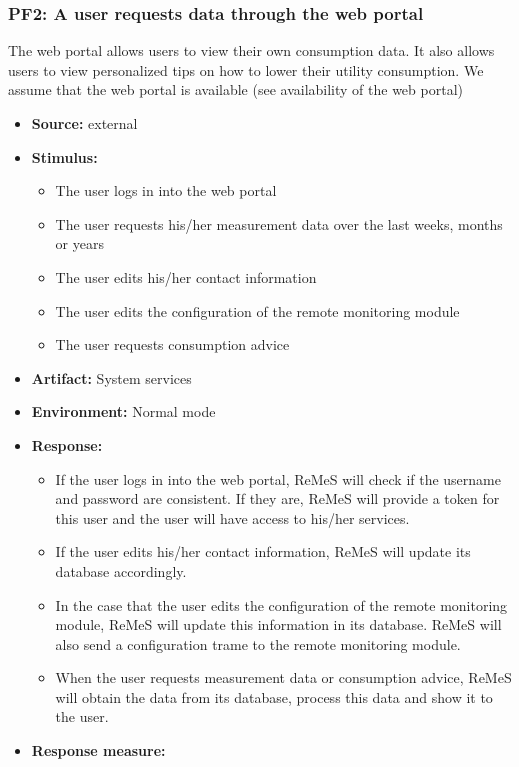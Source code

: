 \subsubsection{PF2: A user requests data through the web portal}
The web portal allows users to view their own consumption data. It also allows users to view
personalized tips on how to lower their utility consumption. We assume that the web portal is available (see availability of the web portal)
\begin{itemize}
	\item \textbf{Source:} external
	\item \textbf{Stimulus:} 
		\begin{itemize}
			\item The user logs in into the web portal
			\item The user requests his/her measurement data over the last weeks, months or years
			\item The user edits his/her contact information
			\item The user edits the configuration of the remote monitoring module
			\item The user requests consumption advice
		\end{itemize}
	\item \textbf{Artifact:} System services
	\item \textbf{Environment:} Normal mode
	\item \textbf{Response:}
		\begin{itemize}
			\item If the user logs in into the web portal, ReMeS will check if the username and password are consistent.
					If they are, ReMeS will provide a token for this user and the user will have access to his/her services.
			\item If the user edits his/her contact information, ReMeS will update its database accordingly.
			\item In the case that the user edits the configuration of the remote monitoring module, ReMeS will update this information
					in its database. ReMeS will also send a configuration trame to the remote monitoring module.
			\item When the user requests measurement data or consumption advice, ReMeS will obtain the data from its database, process
					this data and show it to the user.
		\end{itemize}
	\item \textbf{Response measure:}
		\begin{itemize}

\end{itemize}
\end{itemize}
